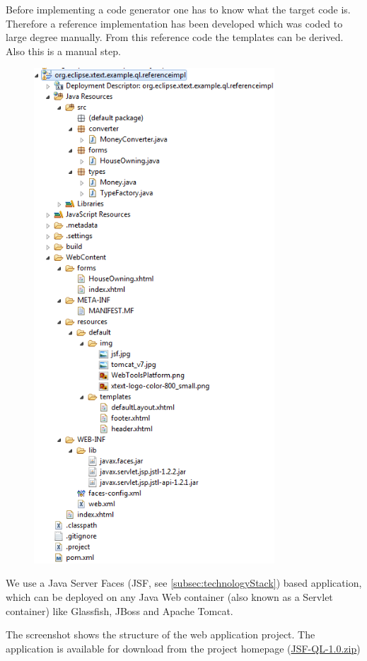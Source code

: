 Before implementing a code generator one has to know what the target code is. Therefore a reference implementation has been
developed which was coded to large degree manually. From this reference code the templates can be derived. Also this is a
manual step.
\begin{figure}
 \includegraphics[width=9cm]{./images/chapter02/referenceimpl_projecttree.png}
\end{figure}
We use a Java Server Faces (JSF, see \ref{subsec:technologyStack}) based
application, which can be deployed on any Java Web container (also known as a Servlet container) like Glassfish, JBoss and Apache Tomcat.

The screenshot shows the structure of the web application project. The application is available for download from the project 
homepage (\href{http://lwc13-xtext.eclipselabs.org.codespot.com/files/JSF-QL-1.0.zip}{JSF-QL-1.0.zip})
 
